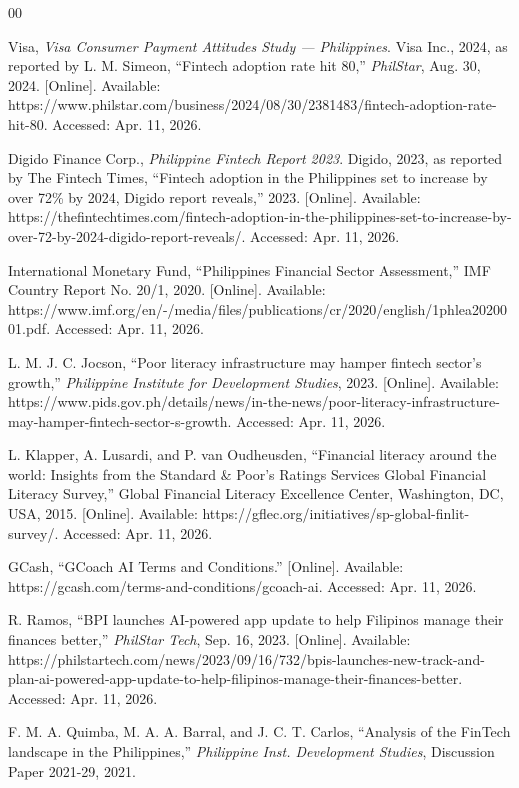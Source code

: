 \documentclass[journal]{./IEEE/IEEEtran}
\begin{document}
\begin{thebibliography}{00}

 Visa, \emph{Visa Consumer Payment Attitudes Study --- Philippines}. Visa Inc., 2024, as reported by L. M. Simeon, ``Fintech adoption rate hit 80,'' \emph{PhilStar}, Aug. 30, 2024. [Online]. Available: https://www.philstar.com/business/2024/08/30/2381483/fintech-adoption-rate-hit-80. Accessed: Apr. 11, 2026.

 Digido Finance Corp., \emph{Philippine Fintech Report 2023}. Digido, 2023, as reported by The Fintech Times, ``Fintech adoption in the Philippines set to increase by over 72\% by 2024, Digido report reveals,'' 2023. [Online]. Available: https://thefintechtimes.com/fintech-adoption-in-the-philippines-set-to-increase-by-over-72-by-2024-digido-report-reveals/. Accessed: Apr. 11, 2026.

 International Monetary Fund, ``Philippines Financial Sector Assessment,'' IMF Country Report No. 20/1, 2020. [Online]. Available: https://www.imf.org/en/-/media/files/publications/cr/2020/english/1phlea2020001.pdf. Accessed: Apr. 11, 2026.

 L. M. J. C. Jocson, ``Poor literacy infrastructure may hamper fintech sector's growth,'' \emph{Philippine Institute for Development Studies}, 2023. [Online]. Available: https://www.pids.gov.ph/details/news/in-the-news/poor-literacy-infrastructure-may-hamper-fintech-sector-s-growth. Accessed: Apr. 11, 2026.

 L. Klapper, A. Lusardi, and P. van Oudheusden, ``Financial literacy around the world: Insights from the Standard \& Poor's Ratings Services Global Financial Literacy Survey,'' Global Financial Literacy Excellence Center, Washington, DC, USA, 2015. [Online]. Available: https://gflec.org/initiatives/sp-global-finlit-survey/. Accessed: Apr. 11, 2026.

 GCash, ``GCoach AI Terms and Conditions.'' [Online]. Available: https://gcash.com/terms-and-conditions/gcoach-ai. Accessed: Apr. 11, 2026.

 R. Ramos, ``BPI launches AI-powered app update to help Filipinos manage their finances better,'' \emph{PhilStar Tech}, Sep. 16, 2023. [Online]. Available: https://philstartech.com/news/2023/09/16/732/bpis-launches-new-track-and-plan-ai-powered-app-update-to-help-filipinos-manage-their-finances-better. Accessed: Apr. 11, 2026.

 F. M. A. Quimba, M. A. A. Barral, and J. C. T. Carlos, ``Analysis of the FinTech landscape in the Philippines,'' \emph{Philippine Inst. Development Studies}, Discussion Paper 2021-29, 2021.


\end{thebibliography}
\end{document}
